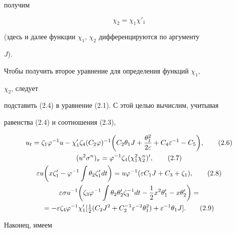 получим 


\begin{equation} 


\chi_2=\chi_1\chi'_1 \tag{2.5} 


\end{equation} 


(здесь и далее функции $\chi_1$, $\chi_2$ дифференцируются по аргументу 


$J$). 


 


Чтобы получить второе уравнение для определения функций $\chi_1$, 


$\chi_2$, следует 


подставить (2.4) в уравнение (2.1). С этой целью вычислим, учитывая 


равенства (2.4) и соотношения (2.3), 


\begin{gather} 


u_t=\zeta_1\varphi^{-1}u-\chi'_1\zeta_4(C_2\varphi)^{-1}\bigg( 


C_2\theta_1J+\frac{\theta^2_1}{2\varepsilon}+C_4\varepsilon^{-1} 


-C_5\bigg), \tag{2.6} \\ 


% 


(u^2\sigma^n)_x=\varphi^{-1}\zeta_4(\chi^2_1\chi^n_2)', \tag{2.7} \\ 


% 


\varepsilon u\bigg(x\zeta'_1-\varphi^{-1}\int\theta_2\zeta'_1 


dt\bigg)=u\varphi^{-1}(\varepsilon C_1J+C_3+\zeta_1),\tag{2.8} \\ 


% 


\varepsilon\sigma u^{-1}\bigg(\zeta_3\varphi^{-1}\int 


\theta_2\theta'_2\zeta^{-1}_3dt-\frac{1}{2}x^2\theta'_1- 


x\theta'_2\bigg)=\notag \\ 


=-\varepsilon\zeta_4\varphi^{-1}\chi'_1[\tfrac{1}{2}(C_2J^2+ 


C^{-1}_2\varepsilon^{-2}\theta^2_1)+\varepsilon^{-1} 


\theta_1J].\tag{2.9} 


\end{gather} 


Наконец, имеем 


